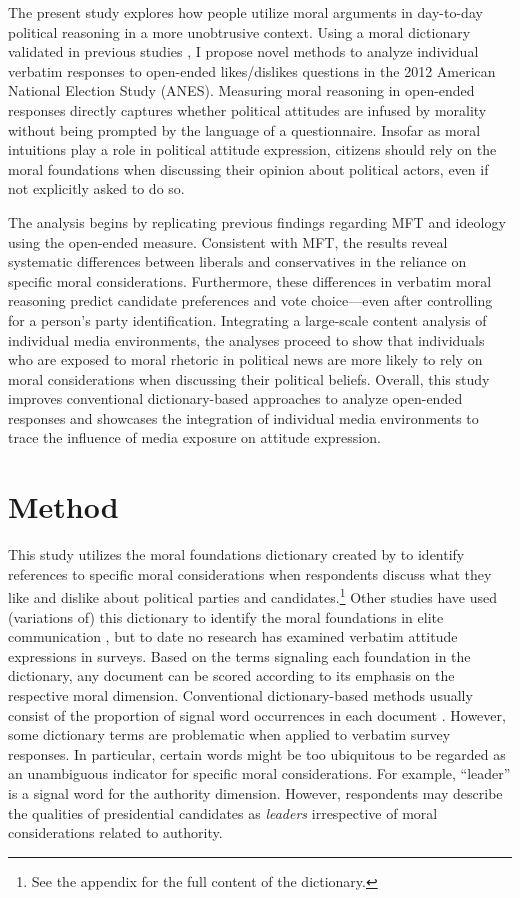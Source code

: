 \documentclass[12pt]{article}
\begin{document}
The present study explores how people utilize moral arguments in day-to-day political reasoning in a more unobtrusive context. Using a moral dictionary validated in previous studies \citep{graham2009liberals}, I propose novel methods to analyze individual verbatim responses to open-ended likes/dislikes questions in the 2012 American National Election Study (ANES). Measuring moral reasoning in open-ended responses directly captures whether political attitudes are infused by morality without being prompted by the language of a questionnaire. Insofar as moral intuitions play a role in political attitude expression, citizens should rely on the moral foundations when discussing their opinion about political actors, even if not explicitly asked to do so.

The analysis begins by replicating previous findings regarding MFT and ideology using the open-ended measure. Consistent with MFT, the results reveal systematic differences between liberals and conservatives in the reliance on specific moral considerations. Furthermore, these differences in verbatim moral reasoning predict candidate preferences and vote choice---even after controlling for a person's party identification. Integrating a large-scale content analysis of individual media environments, the analyses proceed to show that individuals who are exposed to moral rhetoric in political news are more likely to rely on moral considerations when discussing their political beliefs. Overall, this study improves conventional dictionary-based approaches to analyze open-ended responses and showcases the integration of individual media environments to trace the influence of media exposure on attitude expression.


\section*{Method}

This study utilizes the moral foundations dictionary created by \citet{graham2009liberals} to identify references to specific moral considerations when respondents discuss what they like and dislike about political parties and candidates.\footnote{See the appendix for the full content of the dictionary.} Other studies have used (variations of) this dictionary to identify the moral foundations in elite communication \citep[e.g.][]{clifford2015concerns}, but to date no research has examined verbatim attitude expressions in surveys. Based on the terms signaling each foundation in the dictionary, any document can be scored according to its emphasis on the respective moral dimension. Conventional dictionary-based methods usually consist of the proportion of signal word occurrences in each document \citep[e.g.][]{graham2009liberals}. However, some dictionary terms are problematic when applied to verbatim survey responses. In particular, certain words might be too ubiquitous to be regarded as an unambiguous indicator for specific moral considerations. For example, ``leader'' is a signal word for the authority dimension. However, respondents may describe the qualities of presidential candidates as \textit{leaders} irrespective of moral considerations related to authority.
\end{document}
